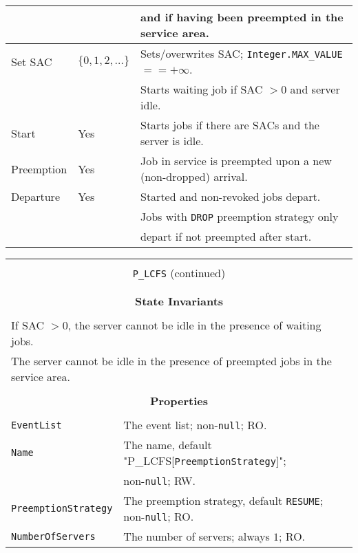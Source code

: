 \documentclass[12pt]{book}
\begin{document}
\begin{tabular}{|l|l|l|}
           &     & and if having been preempted in the service area. \\
\hline
Set SAC & $\{0, 1, 2, \ldots\}$ & Sets/overwrites SAC; \lstinline|Integer.MAX_VALUE| $== +\infty$. \\
        &                       & Starts waiting job if SAC $> 0$ and server idle. \\
\hline
Start & Yes & Starts jobs if there are SACs and the server is idle. \\
\hline
Preemption & Yes & Job in service is preempted upon a new (non-dropped) arrival. \\
\hline
Departure & Yes & Started and non-revoked jobs depart. \\
          &     & Jobs with \lstinline|DROP| preemption strategy only \\
          &     & depart if not preempted after start. \\
\hline
\end{tabular}

\begin{tabular}{|l|l|l|}
\hline
\multicolumn{3}{|c|}{} \\
\multicolumn{3}{|c|}{\lstinline[basicstyle=\large]{P_LCFS} (continued)} \\
\multicolumn{3}{|c|}{} \\
\hline
\multicolumn{3}{|c|}{} \\
\multicolumn{3}{|c|}{\bf State  Invariants} \\
\multicolumn{3}{|c|}{} \\
\hline
\multicolumn{3}{|l|}{If SAC $> 0$, the server cannot be idle in the presence of waiting jobs.} \\
\multicolumn{3}{|l|}{The server cannot be idle in the presence of preempted jobs in the service area.} \\
\hline
\multicolumn{3}{|c|}{} \\
\multicolumn{3}{|c|}{\bf Properties} \\
\multicolumn{3}{|c|}{} \\
\hline
\lstinline|EventList|          & \multicolumn{2}{|l|}{The event list; non-\lstinline|null|; RO.} \\
\hline
\lstinline|Name|               & \multicolumn{2}{|l|}{The name, default "P\_LCFS[\lstinline|PreemptionStrategy|]";} \\
                               & \multicolumn{2}{|l|}{non-\lstinline|null|; RW.} \\
\hline
\lstinline|PreemptionStrategy| & \multicolumn{2}{|l|}{The preemption strategy, default \lstinline|RESUME|;
                                                      non-\lstinline|null|; RO.} \\
\hline
\lstinline|NumberOfServers|    & \multicolumn{2}{|l|}{The number of servers; always $1$; RO.} \\
\hline
\end{tabular}
\end{document}
